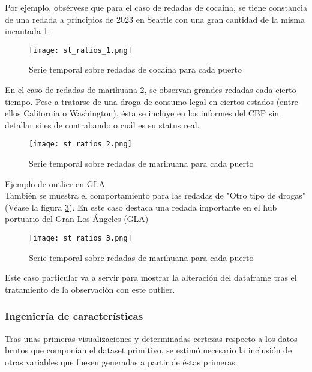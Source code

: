 \documentclass[12pt]{article}
\begin{document}
		Por ejemplo, obsérvese que para el caso de redadas de cocaína, se tiene constancia de una redada a principios de 2023 en Seattle con una gran cantidad de la misma incautada \ref{st_ratio_1}:
		
		\begin{figure}[H]
			\caption{\label{st_ratio_1} Serie temporal sobre redadas de cocaína para cada puerto}
			\centering
			\hspace*{1cm}
			\texttt{[image: st\_ratios\_1.png]}
		\end{figure}
	
		En el caso de redadas de marihuana \ref{st_ratio_2}, se observan grandes redadas cada cierto tiempo. Pese a tratarse de una droga de consumo legal en ciertos estados (entre ellos California o Washington), ésta se incluye en los informes del CBP sin detallar si es de contrabando o cuál es su status real.
		
		\begin{figure}[H]
			\caption{\label{st_ratio_2} Serie temporal sobre redadas de marihuana para cada puerto}
			\centering
			\hspace*{1cm}
			\texttt{[image: st\_ratios\_2.png]}
		\end{figure}
	
		\underline{Ejemplo de outlier en GLA}\\
		También se muestra el comportamiento para las redadas de "Otro tipo de drogas" (Véase la figura \ref{st_ratio_3}). En este caso destaca una redada importante en el hub portuario del Gran Los Ángeles (GLA)
		
		\begin{figure}[H]
			\caption{\label{st_ratio_3} Serie temporal sobre redadas de marihuana para cada puerto}
			\centering
			\hspace*{1cm}
			\texttt{[image: st\_ratios\_3.png]}
		\end{figure}
	
		Este caso particular va a servir para mostrar la alteración del dataframe tras el tratamiento de la observación con este outlier.
		
	
		\subsubsection{\label{feature engineering}Ingeniería de características}
		Tras unas primeras visualizaciones y determinadas certezas respecto a los datos brutos que componían el dataset primitivo, se estimó necesario la inclusión de otras variables que fuesen generadas a partir de éstas primeras.\
		
\end{document}
